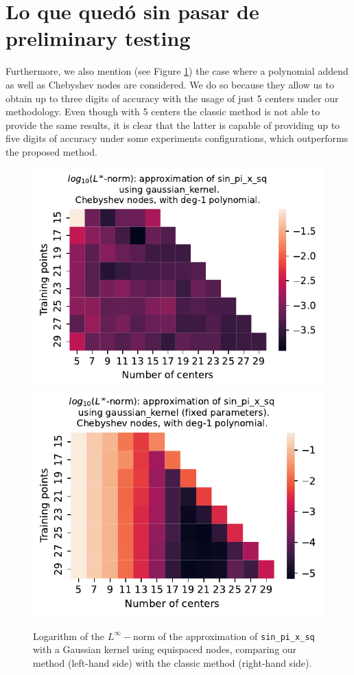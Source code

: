\documentclass[12pt]{report} %
\begin{document}
\section{Lo que quedó sin pasar de preliminary testing}








Furthermore, we also mention (see Figure \ref{fig:sin-pi-x-sq-gaussian-kernel-cheb-poly-comparison-methods}) the case where a polynomial addend as well as Chebyshev nodes are considered. We do so because they allow us to obtain up to three digits of accuracy with the usage of just 5 centers under our methodology. Even though with 5 centers the classic method is not able to provide the same results, it is clear that the latter is capable of providing up to five digits of accuracy under some experiments configurations, which outperforms the proposed method.

\begin{figure}[ht]
  \centering
  \includegraphics[width=.49\textwidth]{imagenes/experiments/1d/variational/sin_pi_x_sq-Kgaussian_kernel-Poly-Cheb.pdf}
  \includegraphics[width=.49\textwidth]{imagenes/experiments/1d/least_squares/opt-sin_pi_x_sq-Kgaussian_kernel-Poly-Cheb.pdf}
  \caption{Logarithm of the $L^\infty-$norm of the approximation of \texttt{sin\_pi\_x\_sq} with a Gaussian kernel using equispaced nodes, comparing our method (left-hand side) with the classic method (right-hand side).}
  \label{fig:sin-pi-x-sq-gaussian-kernel-cheb-poly-comparison-methods}
\end{figure}
\end{document}
